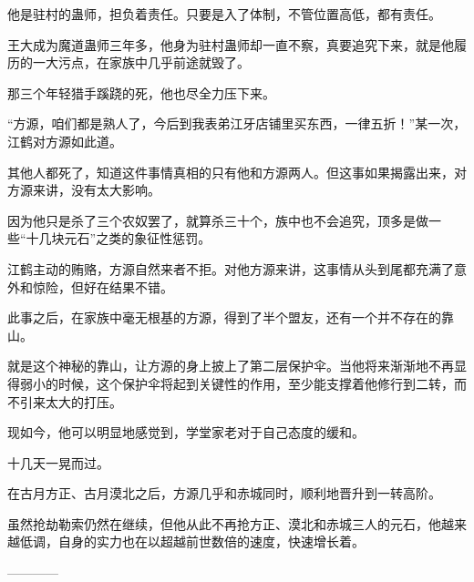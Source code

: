 \begin{this_body}
他是驻村的蛊师，担负着责任。只要是入了体制，不管位置高低，都有责任。

王大成为魔道蛊师三年多，他身为驻村蛊师却一直不察，真要追究下来，就是他履历的一大污点，在家族中几乎前途就毁了。

那三个年轻猎手蹊跷的死，他也尽全力压下来。

“方源，咱们都是熟人了，今后到我表弟江牙店铺里买东西，一律五折！”某一次，江鹤对方源如此道。

其他人都死了，知道这件事情真相的只有他和方源两人。但这事如果揭露出来，对方源来讲，没有太大影响。

因为他只是杀了三个农奴罢了，就算杀三十个，族中也不会追究，顶多是做一些“十几块元石”之类的象征性惩罚。

江鹤主动的贿赂，方源自然来者不拒。对他方源来讲，这事情从头到尾都充满了意外和惊险，但好在结果不错。

此事之后，在家族中毫无根基的方源，得到了半个盟友，还有一个并不存在的靠山。

就是这个神秘的靠山，让方源的身上披上了第二层保护伞。当他将来渐渐地不再显得弱小的时候，这个保护伞将起到关键性的作用，至少能支撑着他修行到二转，而不引来太大的打压。

现如今，他可以明显地感觉到，学堂家老对于自己态度的缓和。

十几天一晃而过。

在古月方正、古月漠北之后，方源几乎和赤城同时，顺利地晋升到一转高阶。

虽然抢劫勒索仍然在继续，但他从此不再抢方正、漠北和赤城三人的元石，他越来越低调，自身的实力也在以超越前世数倍的速度，快速增长着。

------------

\end{this_body}

